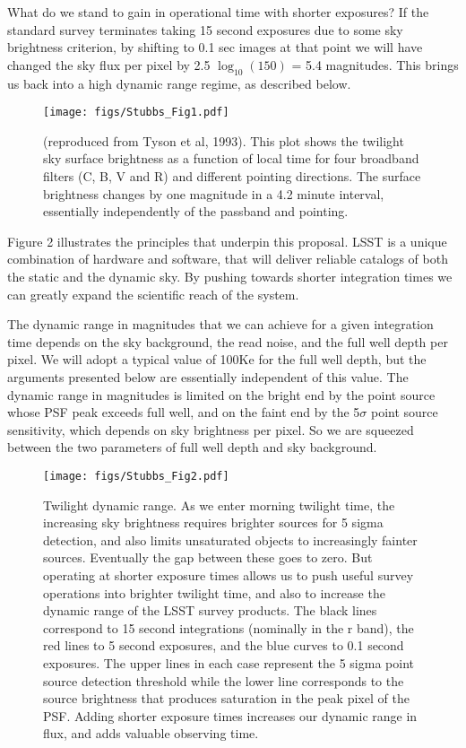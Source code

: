 What do we stand to gain in operational time with shorter exposures? If the standard survey terminates taking 15 second exposures due to some sky brightness criterion, by shifting to 0.1 sec images at that point we will have changed the sky flux per pixel by 2.5 $\log_{10}(150)$ = 5.4 magnitudes. This brings us back into a high dynamic range regime, as described below. 

\begin{figure}[htbp]
\begin{center}
\texttt{[image: figs/Stubbs\_Fig1.pdf]}
\caption{(reproduced from Tyson et al, 1993). This plot shows the 
  twilight sky surface brightness as a function of local time for four
  broadband filters (C, B, V and R) and different pointing directions.
  The surface brightness changes by one magnitude in a 4.2 minute interval,
essentially independently of the passband and pointing.}
\label{fig:Tyson}
\end{center}
\end{figure}

Figure 2 illustrates the principles that underpin this proposal. LSST is a unique combination of hardware and software, that will deliver reliable catalogs of both the static and the dynamic sky. By pushing towards shorter integration times we can greatly expand the scientific reach of the system. 

The dynamic range in magnitudes that we can achieve for a given integration time depends on the sky background, the read noise, and the full well depth per pixel. We will adopt a typical value of 100Ke for the full well depth, but the arguments presented below are essentially independent of this value. The dynamic range in magnitudes is limited on the bright end by the point source whose PSF peak exceeds full well, and on the faint end by the 5$\sigma$ point source sensitivity, which depends on sky brightness per pixel. So we are squeezed between the two parameters of full well depth and sky background. 

\begin{figure}[htbp]
\begin{center}
\texttt{[image: figs/Stubbs\_Fig2.pdf]}
\caption{Twilight dynamic range. As we enter morning twilight time, the increasing sky brightness requires brighter sources for 5 sigma detection, and also limits unsaturated objects to increasingly fainter sources. Eventually the gap between these goes to zero. But operating at shorter exposure times allows us to push useful survey operations into brighter twilight time, and also to increase the dynamic range of the LSST survey products. The black lines correspond to 15 second integrations (nominally in the r band), the red lines to 5 second exposures, and the blue curves to 0.1 second exposures. The upper lines in each case represent the 5 sigma point source detection threshold while the lower line corresponds to the source brightness that produces saturation in the peak pixel of the PSF. Adding shorter exposure times increases our dynamic range in flux, and adds valuable observing time.}
\label{fig:twilight}
\end{center}
\end{figure}

